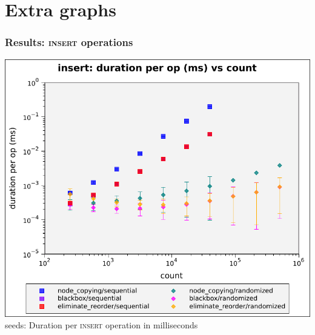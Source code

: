 \documentclass[compress]{beamer}
\begin{document}
\appendix
\section{Extra graphs}

\setlength{\columnseprule}{0.4pt}

\begin{frame}
\frametitle{Results: \textsc{insert} operations}
\begin{multicols}{2}

      \includegraphics[height=0.55\textheight]{figures/graphs/100-seeds/insert-duration-per-op-vs-count.pdf}
       seeds: Duration per \textsc{insert} operation in milliseconds\vphantom{ --- only head node}
      \newline \phantom{ --- only head node}



\end{multicols}
\end{frame}
\end{document}
